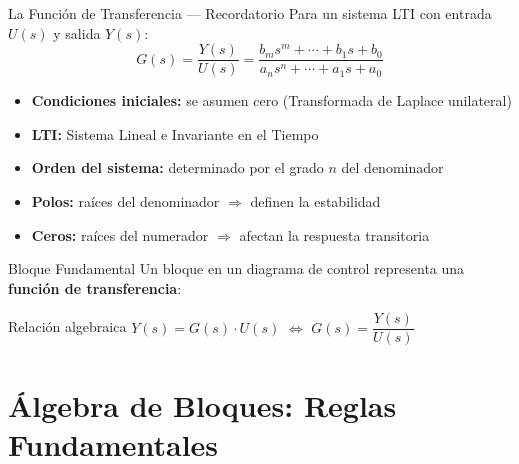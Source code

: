 \documentclass[aspectratio=169,xcolor=dvipsnames]{beamer}
\begin{document}
\begin{frame}{La Funci\'on de Transferencia --- Recordatorio}
    Para un sistema LTI con entrada $U(s)$ y salida $Y(s)$:
    \begin{equation}
        G(s) = \frac{Y(s)}{U(s)} = \frac{b_m s^m + \cdots + b_1 s + b_0}{a_n s^n + \cdots + a_1 s + a_0}
    \end{equation}
    \begin{itemize}
        \item \textbf{Condiciones iniciales:} se asumen cero (Transformada de Laplace unilateral)
        \item \textbf{LTI:} Sistema Lineal e Invariante en el Tiempo
        \item \textbf{Orden del sistema:} determinado por el grado $n$ del denominador
        \item \textbf{Polos:} ra\'ices del denominador $\Rightarrow$ definen la estabilidad
        \item \textbf{Ceros:} ra\'ices del numerador $\Rightarrow$ afectan la respuesta transitoria
    \end{itemize}
\end{frame}

\begin{frame}{Bloque Fundamental}
    Un bloque en un diagrama de control representa una \textbf{funci\'on de transferencia}:
    \vspace{0.6em}
    \begin{center}
    \end{center}
    \vspace{0.4em}
    \begin{exampleblock}{Relaci\'on algebraica}
        $Y(s) = G(s) \cdot U(s)$ \quad $\Longleftrightarrow$ \quad $G(s) = \dfrac{Y(s)}{U(s)}$
    \end{exampleblock}
\end{frame}

\section{\'Algebra de Bloques: Reglas Fundamentales}
\end{document}

